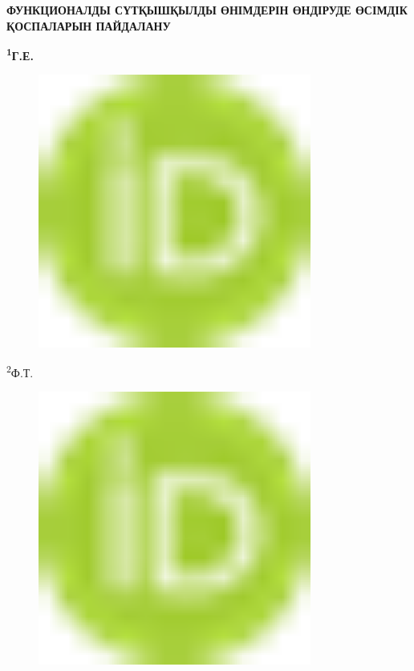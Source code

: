 
{\bfseries ФУНКЦИОНАЛДЫ СҮТҚЫШҚЫЛДЫ ӨНІМДЕРІН ӨНДІРУДЕ ӨСІМДІК ҚОСПАЛАРЫН
ПАЙДАЛАНУ}

{\bfseries \textsuperscript{1}Г.Е.
\begin{figure}[H]
	\centering
	\includegraphics[width=0.8\textwidth]{media/pish2/image1}
	\caption*{}
\end{figure}

\textsuperscript{2}Ф.Т.
\begin{figure}[H]
	\centering
	\includegraphics[width=0.8\textwidth]{media/pish2/image1}
	\caption*{}
\end{figure}

}
